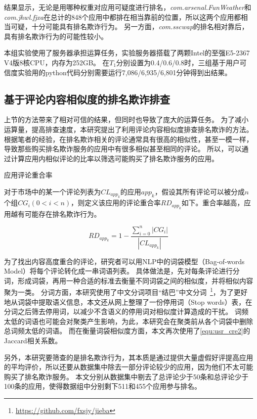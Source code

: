 结果显示，无论是用哪种权重对应用可疑度进行排名，\emph{com.arsenal.FunWeather}和\emph{com.jhwl.fjxa}在总计的848个应用中都排在相当靠前的位置，所以这两个应用都相当可疑，十分可能具有排名欺诈行为。
另一方面，\emph{com.sscwap}的排名相对靠后，具有排名欺诈行为的可能性较小。

本组实验使用了服务器承担运算任务，实验服务器搭载了两颗Intel的至强E5-2367 V4版8核CPU，内存为252GB。
在$T_1$分别设置为0.4/0.6/0.8时，三组基于用户可信度实验用的python代码分别需要运行7,086/6,935/6,801分钟得到出结果。

\subsection{基于评论内容相似度的排名欺诈排查}
上节的方法带来了相对可信的结果，但同时也导致了庞大的运算任务。
为了减小运算量，提高排查速度，本研究提出了利用评论内容相似度排查排名欺诈的方法。
根据笔者的经验，在排名欺诈相关的评论通常具有很高的相似性，甚至一模一样，导致那些购买排名欺诈服务的应用中有很多相似甚至相同的评论。
所以，可以通过计算应用内相似评论的比率以筛选可能购买了排名欺诈服务的应用。

\begin{Def}
	应用评论重合率

	对于市场中的某一个评论列表为$CL_{app_k}$的应用$app_k$，假设其所有评论可以被分成$n$个组$CG_i (0 <i < n)$，则定义该应用的评论重合率$RD_{app_k}$如下。重合率越高，应用越有可能存在排名欺诈行为。
\end{Def}

\begin{equation}
	RD_{app_k} = 1 - \frac{\sum_{i=0}^n|CG_i|}{|CL_{app_k}|}
	\label{equ:cmt_simi1}
\end{equation}
\vspace{0.5mm}

为了找出内容高度重合的评论，研究者可以用NLP中的词袋模型（Bag-of-words Model）将每个评论转化成一串词语列表。
具体做法是，先对每条评论进行分词，形成词袋，再用一种合适的标准去衡量不同词袋之间的相似度，并将相似内容聚为一类。
分词方面，本研究使用了中文分词项目“结巴”中文分词~\footnote{\url{https://github.com/fxsjy/jieba}}，为了更好地从词袋中提取语义信息，本文还从网上整理了一份停用词（Stop words）表，在分词之后筛去停用词，以减少不含语义的停用词对相似度计算造成的干扰。
词频太低的词语也可能会对聚类产生影响，为此，本研究会在聚类前从各个词袋中删除总词频太低的词语。
而在衡量词袋相似度方面，本文再次使用了\autoref{equ:usr_cre2}的Jaccard相关系数。

另外，本研究要筛查的是排名欺诈行为，其本质是通过提供大量虚假好评提高应用的平均评价，所以还要从数据集中除去一部分评论较少的应用，因为他们不太可能购买了排名欺诈服务。
本文分别从数据集中剔去了总评论少于50条和总评论少于100条的应用，使得数据组中分别剩下511和455个应用参与排名。

